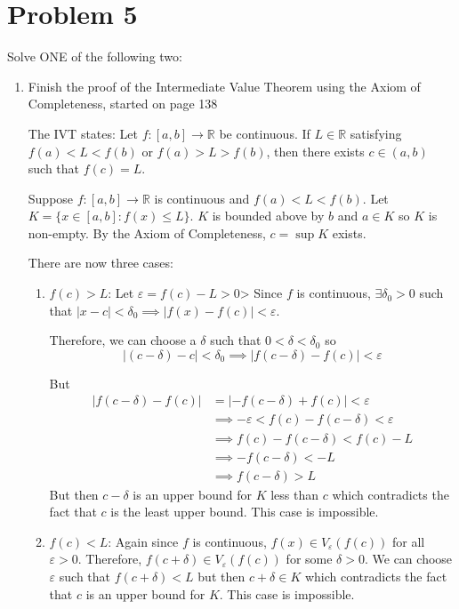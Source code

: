 \documentclass[12pt]{article}
\newcommand{\R}{\mathbb{R}}
\newcommand{\abs}[1]{\left\vert #1 \right\vert}
\newcommand{\ep}{\varepsilon}
\begin{document}
\section*{Problem 5}
Solve ONE of the following two:
\begin{enumerate}
	\item Finish the proof of the Intermediate Value Theorem using the Axiom of Completeness, started on page 138
	
        \color{blue}
            The IVT states: Let $f:[a,b]\to\mathbb{R}$ be continuous. If $L \in \R$ satisfying $f(a) < L < f(b)$ or $f(a) > L > f(b)$, then there exists $c \in (a, b)$ such that $f(c) = L$.

            Suppose $f: [a, b] \to \R$ is continuous and $f(a) < L < f(b)$. Let $K = \{x \in [a, b]: f(x) \leq L\}$. $K$ is bounded above by $b$ and $a \in K$ so $K$ is non-empty. By the Axiom of Completeness, $c = \sup K$ exists.

            There are now three cases:
            \begin{enumerate}
                \item $f(c) > L$: Let $\ep = f(c) - L > 0$> Since $f$ is continuous, $\exists \delta_0 > 0$ such that $\abs{x - c} < \delta_0 \implies \abs{f(x) - f(c)} < \ep$. 
                
                Therefore, we can choose a $\delta$ such that $0 < \delta < \delta_0$ so 
                \[\abs{(c - \delta) - c} < \delta_0 \implies \abs{f(c - \delta) - f(c)} < \ep\]
                
                But 
                \begin{align*}
                    \abs{f(c - \delta) - f(c)} &= \abs{-f(c - \delta) + f(c)} < \ep\\ 
                    &\implies -\ep < f(c) - f(c - \delta) < \ep\\ 
                    &\implies f(c) - f(c - \delta) < f(c) - L\\ 
                    &\implies -f(c - \delta) < -L\\ 
                    &\implies f(c - \delta) > L
                \end{align*}
                But then $c - \delta$ is an upper bound for $K$ less than $c$ which contradicts the fact that $c$ is the least upper bound. This case is impossible.

                \item $f(c) < L$: Again since $f$ is continuous, $f(x) \in V_{\ep}(f(c))$ for all $\ep > 0$. Therefore, $f(c + \delta) \in V_{\ep}(f(c))$ for some $\delta > 0$. We can choose $\ep$ such that $f(c + \delta) < L$ but then $c + \delta \in K$ which contradicts the fact that $c$ is an upper bound for $K$. This case is impossible. 
                

\end{enumerate}
\end{enumerate}
\end{document}
